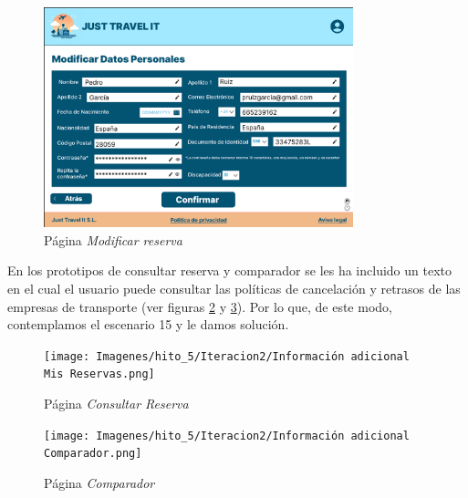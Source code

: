 \begin{figure}[H]
    \centering
    \includegraphics[width = 0.8\textwidth]{Imagenes/hito_5/Iteracion2/Modificar datos.png}
    \caption{Página \textit{Modificar reserva}}
    \label{fig:it2_modificar_reserva}
\end{figure}

En los prototipos de consultar reserva y comparador se les ha incluido un texto en el cual el usuario puede consultar las políticas de cancelación y retrasos de las 
empresas de transporte (ver figuras \ref{fig:it2_consultar_reserva} y \ref{fig:it2_comparador}). Por lo que, de este modo, contemplamos el escenario 15 y le damos solución. \\
\begin{figure}[H]
    \centering
    \texttt{[image: Imagenes/hito\_5/Iteracion2/Información adicional Mis Reservas.png]}
    \caption{Página \textit{Consultar Reserva}}
    \label{fig:it2_consultar_reserva}
\end{figure}

\begin{figure}[H]
    \centering
    \texttt{[image: Imagenes/hito\_5/Iteracion2/Información adicional Comparador.png]}
    \caption{Página \textit{Comparador}}
    \label{fig:it2_comparador}
\end{figure}

